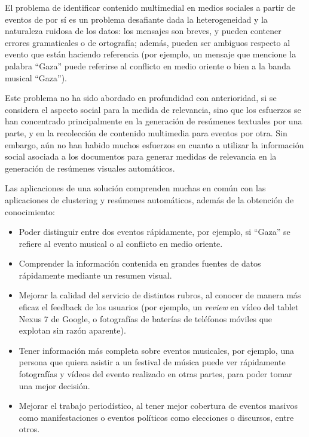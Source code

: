   El problema de identificar contenido multimedial en medios sociales
  a partir de eventos de por sí es un problema desafiante dada la
  heterogeneidad y la naturaleza ruidosa de los datos: los mensajes
  son breves, y pueden contener errores gramaticales o de ortografía;
  además, pueden ser ambiguos respecto al evento que están haciendo
  referencia (por ejemplo, un mensaje que mencione la palabra ``Gaza''
  puede referirse al conflicto en medio oriente o bien a la banda
  musical ``Gaza'').

  Este problema no ha sido abordado en profundidad con anterioridad,
  si se considera el aspecto social para la medida de relevancia,
  sino que los esfuerzos se han concentrado principalmente en la
  generación de resúmenes textuales por una parte\cite{Conrad:2005:EDC:1165485.1165513,allan2002topic,DBLP:conf:spire:Bravo-MarquezM12,Diakopoulos:2012:FAS:2208276.2208409},
  y en la recolección de contenido multimedia para eventos por
  otra\cite{Becker:2012:ICP:2124295.2124360,Liu:2011:USM:2072609.2072613,Becker:2010:LSM:1718487.1718524}. Sin embargo, aún no
  han habido muchos esfuerzos en cuanto a utilizar la información
  social asociada a los documentos para generar medidas de relevancia
  en la generación de resúmenes visuales automáticos.

  Las aplicaciones de una solución comprenden muchas en común con las
  aplicaciones de clustering y resúmenes automáticos, además de la
  obtención de conocimiento:

\begin{itemize}
\item Poder distinguir entre dos eventos rápidamente, por ejemplo, si
    ``Gaza'' se refiere al evento musical o al conflicto en medio
    oriente.
\item Comprender la información contenida en grandes fuentes de datos
    rápidamente mediante un resumen visual.
\item Mejorar la calidad del servicio de distintos rubros, al conocer de
    manera más eficaz el feedback de los usuarios (por ejemplo, un
    \emph{review} en vídeo del tablet Nexus 7 de Google, o fotografías de
    baterías de teléfonos móviles que explotan sin razón aparente).
\item Tener información más completa sobre eventos musicales, por
    ejemplo, una persona que quiera asistir a un festival de música
    puede ver rápidamente fotografías y vídeos del evento realizado en
    otras partes, para poder tomar una mejor decisión.
\item Mejorar el trabajo periodístico, al tener mejor cobertura de
    eventos masivos como manifestaciones o eventos políticos como
    elecciones o discursos, entre otros.
\end{itemize}